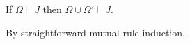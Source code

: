 \begin{lemma}[Weakening]\label{lemma:weakening-P}  If $\Omega \vdash J$ then $\Omega \cup \Omega' \vdash J$.
\end{lemma}
\begin{proof-sketch} By straightforward mutual rule induction.
\end{proof-sketch}

